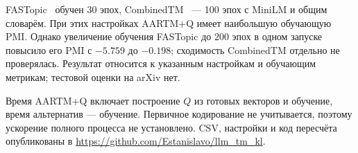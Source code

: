 FASTopic~\cite{wu2024} обучен 30 эпох, CombinedTM~\cite{bianchi2021} --- 100 эпох с MiniLM и общим словарём. При этих настройках AARTM+Q имеет наибольшую обучающую PMI. Однако увеличение обучения FASTopic до 200 эпох в одном запуске повысило его PMI с $-5.759$ до $-0.198$; сходимость CombinedTM отдельно не проверялась. Результат относится к указанным настройкам и обучающим метрикам; тестовой оценки на arXiv нет.

Время AARTM+Q включает построение $Q$ из готовых векторов и обучение, время альтернатив --- обучение. Первичное кодирование не учитывается, поэтому ускорение полного процесса не установлено. CSV, настройки и код пересчёта опубликованы в \url{https://github.com/Estanislavo/llm_tm_kl}.
